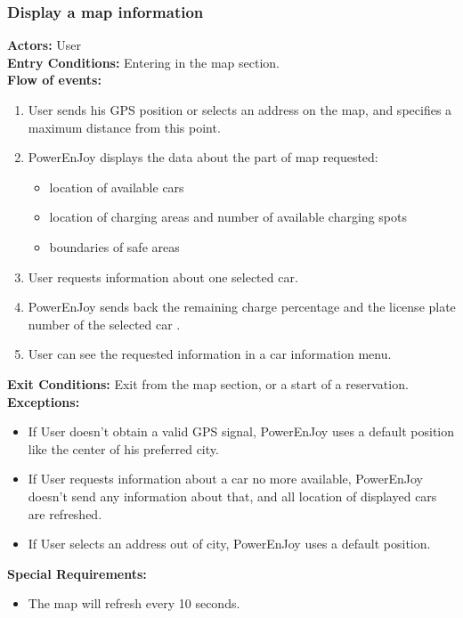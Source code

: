\subsubsection{Display a map information}
%
\textbf{Actors:}
User\\
%
\textbf{Entry Conditions:}
Entering in the map section. \\
%
\textbf{Flow of events:}
\begin{enumerate}
\item User sends his GPS position or selects an address on the map, and specifies a maximum distance from this point.
\item PowerEnJoy displays the data about the part of map requested: 
\begin{itemize}
\item location of available cars
\item location of charging areas and number of available charging spots
\item boundaries of safe areas 
\end{itemize}
\item User requests information about one selected car.
\item PowerEnJoy sends back the remaining charge percentage and the license plate number of the selected car .
\item User can see the requested information in a car information menu.
\end{enumerate}
%
\textbf{Exit Conditions:}
Exit from the map section, or a start of a reservation. \\
%
\textbf{Exceptions:}
\begin{itemize}
\item If User doesn't obtain a valid GPS signal, PowerEnJoy uses a default position like the center of his preferred city.
\item If User requests information about a car no more available, PowerEnJoy doesn't send any information about that, and all location of displayed cars are refreshed.
\item If User selects an address out of city, PowerEnJoy uses a default position.
\end{itemize}
%
\textbf{Special Requirements:}
\begin{itemize}
\item The map will refresh every 10 seconds.
\end{itemize}


